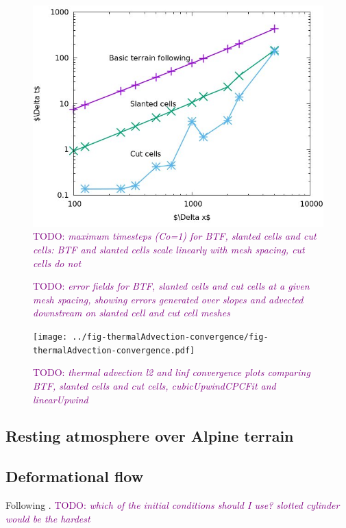 \documentclass{article}
\newcommand{\TODO}[1]{\textcolor{purple}{TODO: \emph{#1}}}
\begin{document}
\begin{figure}
	\includegraphics[width=\textwidth]{maxTimesteps.png}
	\caption{\TODO{maximum timesteps (Co=1) for BTF, slanted cells and cut cells: BTF and slanted cells scale linearly with mesh spacing, cut cells do not}}
\end{figure}

\begin{figure}
	\caption{\TODO{error fields for BTF, slanted cells and cut cells at a given mesh spacing, showing errors generated over slopes and advected downstream on slanted cell and cut cell meshes}}
\end{figure}

\begin{figure}
	\texttt{[image: ../fig-thermalAdvection-convergence/fig-thermalAdvection-convergence.pdf]}
	\caption{\TODO{thermal advection l2 and linf convergence plots comparing BTF, slanted cells and cut cells, cubicUpwindCPCFit and linearUpwind}}
\end{figure}

\subsection{Resting atmosphere over Alpine terrain}

\subsection{Deformational flow}
Following \citep{lauritzen2012}.  \TODO{which of the initial conditions should I use?  slotted cylinder would be the hardest}
\end{document}
